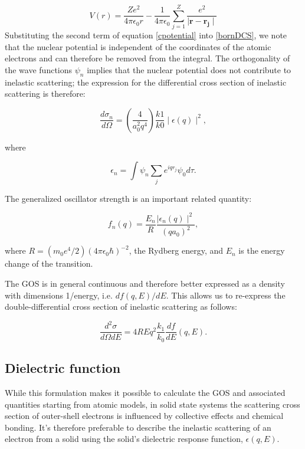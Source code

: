 \documentclass [11pt, proquest, article] {uwthesis}[2016/11/22]
\begin{document}
\begin{equation} \label{cpotential}
V(r) = \frac{Ze^2}{4\pi \epsilon_0 r} - \frac{1}{4 \pi \epsilon_0} \sum_{j = 1}^Z \frac{e^2}{\mid \mathbf{r} - \mathbf{r_j} \mid}
\end{equation}
Substituting the second term of equation \ref{cpotential} into \ref{bornDCS}, we note that the nuclear potential is independent of the coordinates of the atomic electrons and can therefore be removed from the integral. The orthogonality of the wave functions $\psi_n$ implies that the nuclear potential does not contribute to inelastic scattering; the expression for the differential cross section of inelastic scattering is therefore:

\begin{equation} \label{inelasticDCS}
\frac{d\sigma_n}{d\Omega} = (\frac{4}{a_0^2 q^4}) \frac{k1}{k0} \mid \epsilon(q)\mid^2,
\end{equation}

where

\begin{equation}
	\epsilon_n = \int \psi_n \sum_j e^{i q r_j} \psi_0 d\tau.
\end{equation}


The generalized oscillator strength is an important related quantity:

\begin{equation}
f_n(q) = \frac{E_n}{R} \frac{\mid \epsilon_n(q)\mid ^2}{(q a_0)^2},
\end{equation}


where $R = (m_0 e^4 / 2)(4 \pi \epsilon_0 \hbar)^{-2}$, the Rydberg energy, and $E_n$ is the energy change of the transition. 

The GOS is in general continuous and therefore better expressed as a density with dimensions 1/energy, i.e. $df(q, E)/dE$. This allows us to re-express the double-differential cross section of inelastic scattering as follows:

\begin{equation} \label{inelastic_DDCS}
\frac{d^2\sigma}{d\Omega dE} = {4 R}{Eq^2} \frac{k_1}{k_0} \frac{df}{dE}(q, E).
\end{equation}


\subsection{Dielectric function}
While this formulation makes it possible to calculate the GOS and associated quantities starting from atomic models, in solid state systems the scattering cross section of outer-shell electrons is influenced by collective effects and chemical bonding. It's therefore preferable to describe the inelastic scattering of an electron from a solid using the solid's dielectric response function, $\epsilon(q, E)$. 
\end{document}
